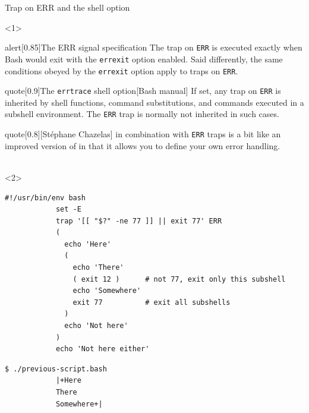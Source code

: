 \begin{frame}[fragile]{Trap on ERR and the  shell option}
    \begin{onlyenv}<1>
        \begin{varblock}{alert}[0.85\textwidth]{The ERR signal specification}
            The trap on \texttt{ERR} is executed exactly when Bash would exit with the \texttt{errexit} option enabled.
            Said differently, the same conditions obeyed by the \texttt{errexit} option apply to traps on \texttt{ERR}.
        \end{varblock}
        \begin{varblock}{quote}[0.9\textwidth]{The \;\texttt{errtrace}\; shell option}[Bash manual]
            If set, any trap on \texttt{ERR} is inherited by shell functions, command substitutions, and commands executed in a subshell environment.
            The \texttt{ERR} trap is normally not inherited in such cases.
        \end{varblock}
        \begin{varblock}{quote}[0.8\textwidth]{}[St\'ephane Chazelas]
             in combination with \texttt{ERR} traps is a bit like an improved version of  in that it allows you to define your own error handling.\\[-0.5em] ~
        \end{varblock}
    \end{onlyenv}
    \begin{onlyenv}<2>
        \begin{lstlisting}[style=myBash, aboveskip=2mm]
            #!/usr/bin/env bash
            set -E
            trap '[[ "$?" -ne 77 ]] || exit 77' ERR
            (
              echo 'Here'
              (
                echo 'There'
                ( exit 12 )      # not 77, exit only this subshell
                echo 'Somewhere'
                exit 77          # exit all subshells
              )
              echo 'Not here'
            )
            echo 'Not here either'
        \end{lstlisting}
        \begin{lstlisting}[style=myBash, aboveskip=2mm, numbers=none]
            $ ./previous-script.bash
            |+Here
            There
            Somewhere+|
        \end{lstlisting}
    \end{onlyenv}
\end{frame}
